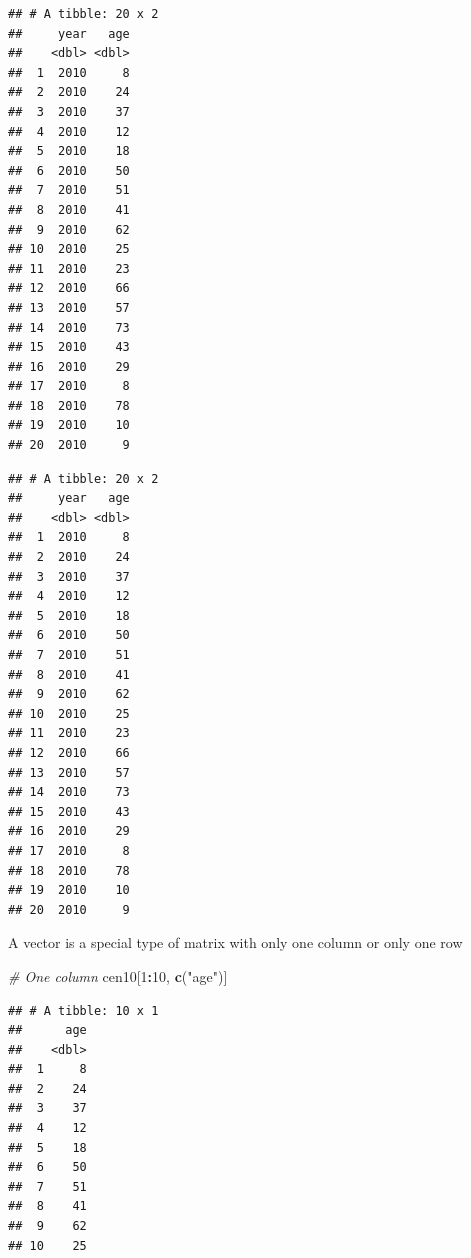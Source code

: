 \documentclass[]{book}
\newenvironment{Shaded}{\begin{snugshade}}{\end{snugshade}}
\newcommand{\CommentTok}[1]{\textcolor[rgb]{0.56,0.35,0.01}{\textit{#1}}}
\newcommand{\DecValTok}[1]{\textcolor[rgb]{0.00,0.00,0.81}{#1}}
\newcommand{\KeywordTok}[1]{\textcolor[rgb]{0.13,0.29,0.53}{\textbf{#1}}}
\newcommand{\NormalTok}[1]{#1}
\newcommand{\OperatorTok}[1]{\textcolor[rgb]{0.81,0.36,0.00}{\textbf{#1}}}
\newcommand{\StringTok}[1]{\textcolor[rgb]{0.31,0.60,0.02}{#1}}
\theoremstyle{definition}
\theoremstyle{definition}
\theoremstyle{definition}
\theoremstyle{remark}
\begin{document}
\begin{verbatim}
## # A tibble: 20 x 2
##     year   age
##    <dbl> <dbl>
##  1  2010     8
##  2  2010    24
##  3  2010    37
##  4  2010    12
##  5  2010    18
##  6  2010    50
##  7  2010    51
##  8  2010    41
##  9  2010    62
## 10  2010    25
## 11  2010    23
## 12  2010    66
## 13  2010    57
## 14  2010    73
## 15  2010    43
## 16  2010    29
## 17  2010     8
## 18  2010    78
## 19  2010    10
## 20  2010     9
\end{verbatim}

\begin{Shaded}
\end{Shaded}

\begin{verbatim}
## # A tibble: 20 x 2
##     year   age
##    <dbl> <dbl>
##  1  2010     8
##  2  2010    24
##  3  2010    37
##  4  2010    12
##  5  2010    18
##  6  2010    50
##  7  2010    51
##  8  2010    41
##  9  2010    62
## 10  2010    25
## 11  2010    23
## 12  2010    66
## 13  2010    57
## 14  2010    73
## 15  2010    43
## 16  2010    29
## 17  2010     8
## 18  2010    78
## 19  2010    10
## 20  2010     9
\end{verbatim}

A vector is a special type of matrix with only one column or only one row

\begin{Shaded}
\begin{Highlighting}[]
\CommentTok{# One column}
\NormalTok{cen10[}\DecValTok{1}\OperatorTok{:}\DecValTok{10}\NormalTok{, }\KeywordTok{c}\NormalTok{(}\StringTok{"age"}\NormalTok{)]}
\end{Highlighting}
\end{Shaded}

\begin{verbatim}
## # A tibble: 10 x 1
##      age
##    <dbl>
##  1     8
##  2    24
##  3    37
##  4    12
##  5    18
##  6    50
##  7    51
##  8    41
##  9    62
## 10    25
\end{verbatim}

\begin{Shaded}
\end{Shaded}
\end{document}
